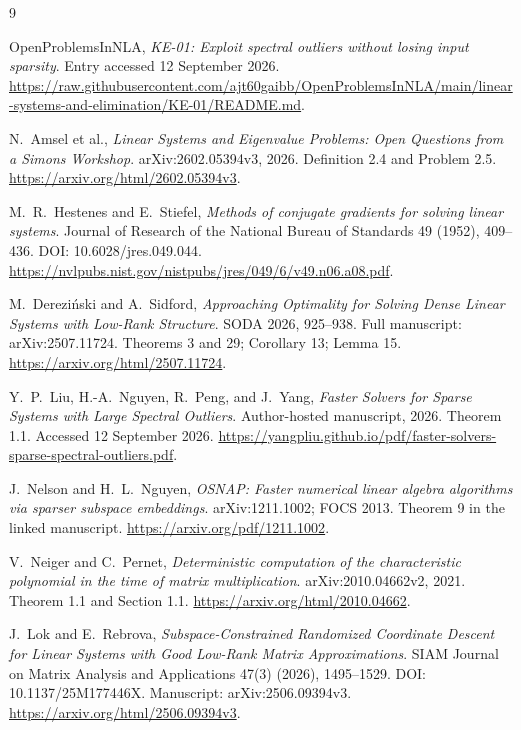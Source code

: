 \documentclass[11pt,a4paper]{article}
\theoremstyle{definition}
\theoremstyle{remark}
\begin{document}
\begin{thebibliography}{9}
OpenProblemsInNLA, \emph{KE-01: Exploit spectral outliers without losing input sparsity}. Entry accessed 12 September 2026.
\url{https://raw.githubusercontent.com/ajt60gaibb/OpenProblemsInNLA/main/linear-systems-and-elimination/KE-01/README.md}.

N.~Amsel et al., \emph{Linear Systems and Eigenvalue Problems: Open Questions from a Simons Workshop}. arXiv:2602.05394v3, 2026. Definition 2.4 and Problem 2.5.
\url{https://arxiv.org/html/2602.05394v3}.

M.~R.~Hestenes and E.~Stiefel, \emph{Methods of conjugate gradients for solving linear systems}. Journal of Research of the National Bureau of Standards 49 (1952), 409--436. DOI: 10.6028/jres.049.044.
\url{https://nvlpubs.nist.gov/nistpubs/jres/049/6/v49.n06.a08.pdf}.

M.~Derezi\'nski and A.~Sidford, \emph{Approaching Optimality for Solving Dense Linear Systems with Low-Rank Structure}. SODA 2026, 925--938. Full manuscript: arXiv:2507.11724. Theorems 3 and 29; Corollary 13; Lemma 15.
\url{https://arxiv.org/html/2507.11724}.

Y.~P.~Liu, H.-A.~Nguyen, R.~Peng, and J.~Yang, \emph{Faster Solvers for Sparse Systems with Large Spectral Outliers}. Author-hosted manuscript, 2026. Theorem 1.1. Accessed 12 September 2026.
\url{https://yangpliu.github.io/pdf/faster-solvers-sparse-spectral-outliers.pdf}.

J.~Nelson and H.~L.~Nguyen, \emph{OSNAP: Faster numerical linear algebra algorithms via sparser subspace embeddings}. arXiv:1211.1002; FOCS 2013. Theorem 9 in the linked manuscript.
\url{https://arxiv.org/pdf/1211.1002}.

V.~Neiger and C.~Pernet, \emph{Deterministic computation of the characteristic polynomial in the time of matrix multiplication}. arXiv:2010.04662v2, 2021. Theorem 1.1 and Section 1.1.
\url{https://arxiv.org/html/2010.04662}.

J.~Lok and E.~Rebrova, \emph{Subspace-Constrained Randomized Coordinate Descent for Linear Systems with Good Low-Rank Matrix Approximations}. SIAM Journal on Matrix Analysis and Applications 47(3) (2026), 1495--1529. DOI: 10.1137/25M177446X. Manuscript: arXiv:2506.09394v3.
\url{https://arxiv.org/html/2506.09394v3}.
\end{thebibliography}
\end{document}
